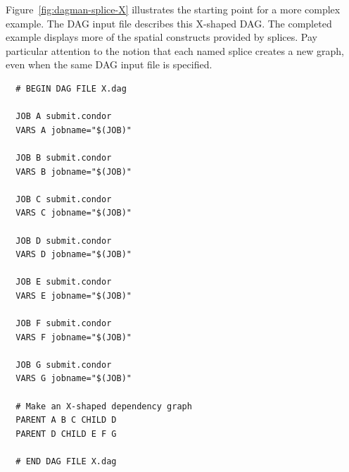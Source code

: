 Figure~\ref{fig:dagman-splice-X} illustrates the starting point
for a more complex example.
The DAG input file  describes this X-shaped DAG.
The completed example displays more of
the spatial constructs provided by splices.
Pay particular attention to the notion that each named splice creates a
new graph, even when the same DAG input file is specified.


\begin{verbatim}
  # BEGIN DAG FILE X.dag

  JOB A submit.condor
  VARS A jobname="$(JOB)"

  JOB B submit.condor
  VARS B jobname="$(JOB)"

  JOB C submit.condor
  VARS C jobname="$(JOB)"

  JOB D submit.condor
  VARS D jobname="$(JOB)"

  JOB E submit.condor
  VARS E jobname="$(JOB)"

  JOB F submit.condor
  VARS F jobname="$(JOB)"

  JOB G submit.condor
  VARS G jobname="$(JOB)"

  # Make an X-shaped dependency graph
  PARENT A B C CHILD D
  PARENT D CHILD E F G

  # END DAG FILE X.dag
\end{verbatim}

